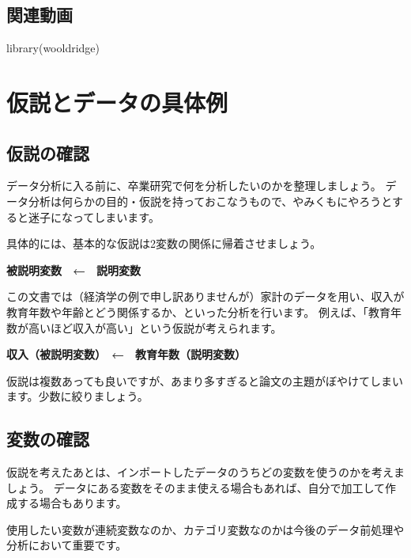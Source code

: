 \documentclass[
]{book}
\newenvironment{Shaded}{\begin{snugshade}}{\end{snugshade}}
\newcommand{\FunctionTok}[1]{\textcolor[rgb]{0.00,0.00,0.00}{#1}}
\newcommand{\NormalTok}[1]{#1}
\begin{document}
\hypertarget{movieImportData}{%
\section{関連動画}\label{movieImportData}}

\begin{Shaded}
\begin{Highlighting}[]
\FunctionTok{library}\NormalTok{(wooldridge)}
\end{Highlighting}
\end{Shaded}

\hypertarget{Hypotheses}{%
\chapter{仮説とデータの具体例}\label{Hypotheses}}

\hypertarget{ux4eeeux8aacux306eux78baux8a8d}{%
\section{仮説の確認}\label{ux4eeeux8aacux306eux78baux8a8d}}

データ分析に入る前に、卒業研究で何を分析したいのかを整理しましょう。
データ分析は何らかの目的・仮説を持っておこなうもので、やみくもにやろうとすると迷子になってしまいます。

具体的には、基本的な仮説は2変数の関係に帰着させましょう。

\textbf{被説明変数　←　説明変数}

この文書では（経済学の例で申し訳ありませんが）家計のデータを用い、収入が教育年数や年齢とどう関係するか、といった分析を行います。
例えば、「教育年数が高いほど収入が高い」という仮説が考えられます。

\textbf{収入（被説明変数）　←　教育年数（説明変数）}

仮説は複数あっても良いですが、あまり多すぎると論文の主題がぼやけてしまいます。少数に絞りましょう。

\hypertarget{ux5909ux6570ux306eux78baux8a8d}{%
\section{変数の確認}\label{ux5909ux6570ux306eux78baux8a8d}}

仮説を考えたあとは、インポートしたデータのうちどの変数を使うのかを考えましょう。
データにある変数をそのまま使える場合もあれば、自分で加工して作成する場合もあります。

使用したい変数が連続変数なのか、カテゴリ変数なのかは今後のデータ前処理や分析において重要です。
\end{document}
